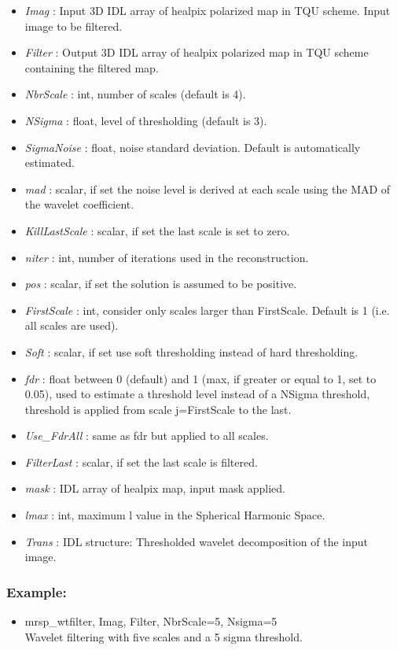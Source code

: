\begin{itemize}
\item {\em Imag} : Input 3D IDL array of healpix polarized map in TQU scheme. Input image to be filtered.
\item {\em Filter} : Output 3D IDL array of healpix polarized map in TQU scheme containing the filtered map.
\item {\em NbrScale} : int, number of scales (default is 4).
\item {\em NSigma} : float, level of thresholding (default is 3).
\item {\em SigmaNoise} : float, noise standard deviation. Default is automatically estimated.
\item {\em mad} : scalar, if set the noise level is derived at each scale using the MAD of the wavelet coefficient.
\item {\em KillLastScale} : scalar, if set the last scale is set to zero.
\item {\em niter} : int, number of iterations used in the reconstruction.
\item {\em pos} : scalar, if set the solution is assumed to be positive.
\item {\em FirstScale} : int, consider only scales larger than FirstScale. Default is 1 (i.e. all scales are used).
\item {\em Soft} : scalar, if set use soft thresholding instead of hard thresholding.
\item {\em fdr} : float between 0 (default) and 1 (max, if greater or equal to 1, set to 0.05), used to estimate a threshold level 
instead of a NSigma threshold, threshold is applied from scale j=FirstScale to the last.
\item {\em Use\_FdrAll} : same as fdr but applied to all scales.
\item {\em FilterLast} : scalar, if set the last scale is filtered.
\item {\em mask} : IDL array of healpix map, input mask applied.
\item {\em lmax} : int, maximum l value in the Spherical Harmonic Space.
\item {\em Trans} : IDL structure: Thresholded wavelet decomposition of the input image.
\end{itemize}


\subsubsection*{Example:} 
\begin{itemize}
\item mrsp\_wtfilter, Imag, Filter, NbrScale=5, Nsigma=5 \\
Wavelet filtering with five scales and a 5 sigma threshold.
\end{itemize}


